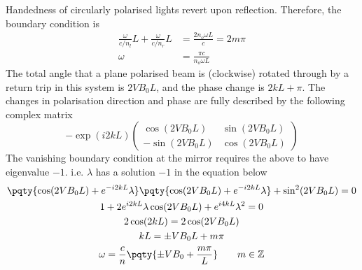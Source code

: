\documentclass[12pt]{extarticle}
\begin{document}
\begin{outline}[enumerate]
        Handedness of circularly polarised lights revert upon reflection. Therefore, the boundary condition is \begin{align*}
            \frac{\omega}{c /n_l}L + \frac{\omega}{c /n_r}L &= \frac{2 n_o \omega L}{c} = 2m\pi\\
            \omega &= \frac{\pi c}{n_o \omega L}
        \end{align*}
        \2 The total angle that a plane polarised beam is (clockwise) rotated through by a return trip in this system is \(2VB_0 L\), and the phase change is \(2kL + \pi \). The changes in polarisation direction and phase are fully described by the following complex matrix
        \[
            -\exp(i2kL)\begin{pmatrix} \cos(2VB_0 L) & \sin(2VB_0 L) \\ -\sin(2VB_0 L) &\cos(2VB_0 L) \end{pmatrix} 
        \]
        The vanishing boundary condition at the mirror requires the above to have eigenvalue \( - 1\). i.e. \(\lambda\) has a solution \( - 1\) in the equation below
        \begin{gather*}
            \pqty{\cos(2VB_0 L) +e^{ - i 2kL}\lambda} \pqty{\cos(2VB_0 L) + e^{ - i2kL}\lambda} + \sin^2(2VB_0 L) = 0\\
            1 + 2 e^{i 2kL}\lambda \cos(2VB_0 L) + e^{i 4kL}\lambda^2 = 0\\
            2\cos(2kL) = 2  \cos(2VB_0 L)\\
            kL = \pm VB_0 L + m\pi\\
            \omega  = \frac{c}{n}\pqty{\pm VB_0  + \frac{m\pi}{L}} \qquad m\in \mathbb{Z}
        \end{gather*}
        

\end{outline}
\end{document}
